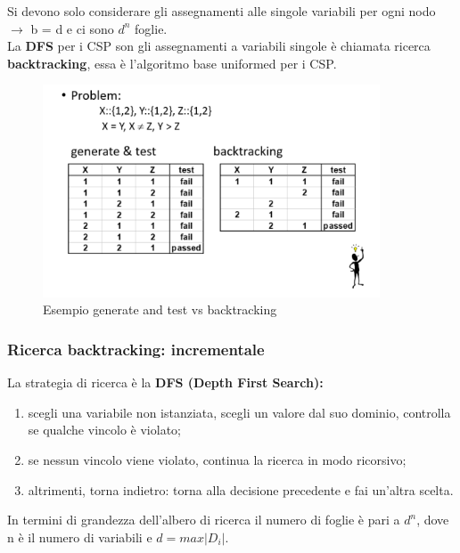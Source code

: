 Si devono solo considerare gli assegnamenti alle singole variabili per ogni nodo $\rightarrow$ b = d
e ci sono $d^n$ foglie. 
\\La \textbf{DFS} per i CSP son gli assegnamenti a variabili singole è chiamata ricerca \textbf{backtracking}, essa è l’algoritmo base uniformed per i CSP.
\begin{figure}[htp]
	\centering
    \includegraphics[width=10cm, keepaspectratio]{img/Cap2/back2.png}
    \caption{Esempio generate and test vs backtracking}
\end{figure}

\subsubsection{Ricerca backtracking: incrementale}
La strategia di ricerca è la \textbf{DFS (Depth First Search):}
\begin{enumerate}
    \item scegli una variabile non istanziata, scegli un valore dal suo dominio, controlla se qualche vincolo è violato;
    \item se nessun vincolo viene violato, continua la ricerca in modo ricorsivo;
    \item altrimenti, torna indietro: torna alla decisione precedente e fai un’altra scelta.
\end{enumerate}
In termini di grandezza dell’albero di ricerca il numero di foglie è pari a $d^n$, dove n è il numero di variabili e $d = max|D_i|$.

